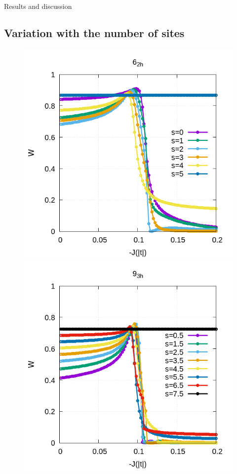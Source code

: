 \documentclass[12pt,twoside]{report}
\begin{document}
\begin{chapter}{Results and discussion}
	\subsection{Variation with the number of sites}
	\begin{figure}[ht]
		\centering
		\hspace{-2cm}
		\begin{minipage}{0.4\textwidth}
			\includegraphics[scale=0.3]{W_vs_J_sites_2-xrep-0.png}
		\end{minipage}
		\hspace{2cm}
		\begin{minipage}{0.4\textwidth}
			\includegraphics[scale=0.3]{W_vs_J_sites_3-xrep-0.png}

\end{minipage}
\end{figure}
\end{chapter}
\end{document}
